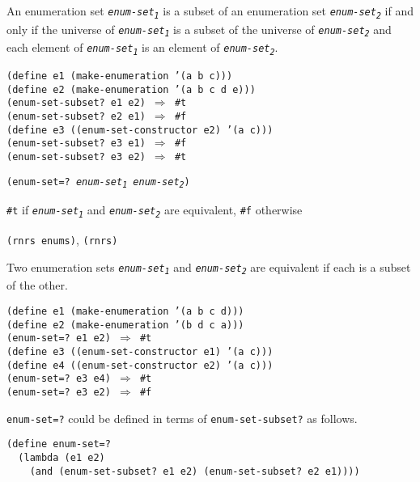 An enumeration set \texttt{\textit{enum-set\textsubscript{1}}} is a subset of an enumeration set \texttt{\textit{enum-set\textsubscript{2}}}
if and only if the universe of \texttt{\textit{enum-set\textsubscript{1}}} is a subset of the universe of \texttt{\textit{enum-set\textsubscript{2}}}
and each element of \texttt{\textit{enum-set\textsubscript{1}}} is an element of \texttt{\textit{enum-set\textsubscript{2}}}.


\begin{alltt}
(define e1 (make-enumeration '(a b c)))
(define e2 (make-enumeration '(a b c d e)))
(enum-set-subset? e1 e2) \(\Rightarrow\) \#{}t
(enum-set-subset? e2 e1) \(\Rightarrow\) \#{}f
(define e3 ((enum-set-constructor e2) '(a c)))
(enum-set-subset? e3 e1) \(\Rightarrow\) \#{}f
(enum-set-subset? e3 e2) \(\Rightarrow\) \#{}t
\end{alltt}

\begin{description}

\label{objects_s296}\item[procedure] \texttt{(enum-set=? \textit{enum-set\textsubscript{1}} \textit{enum-set\textsubscript{2}})}



\item[returns] \texttt{\#{}t} if \texttt{\textit{enum-set\textsubscript{1}}} and \texttt{\textit{enum-set\textsubscript{2}}} are equivalent, \texttt{\#{}f} otherwise


\item[libraries] \texttt{(rnrs enums)}, \texttt{(rnrs)}
\end{description}


Two enumeration sets \texttt{\textit{enum-set\textsubscript{1}}} and \texttt{\textit{enum-set\textsubscript{2}}} are equivalent if each is
a subset of the other.


\begin{alltt}
(define e1 (make-enumeration '(a b c d)))
(define e2 (make-enumeration '(b d c a)))
(enum-set=? e1 e2) \(\Rightarrow\) \#{}t
(define e3 ((enum-set-constructor e1) '(a c)))
(define e4 ((enum-set-constructor e2) '(a c)))
(enum-set=? e3 e4) \(\Rightarrow\) \#{}t
(enum-set=? e3 e2) \(\Rightarrow\) \#{}f
\end{alltt}

\texttt{enum-set=?} could be defined in terms of \texttt{enum-set-subset?} as follows.

\begin{alltt}
(define enum-set=?
  (lambda (e1 e2)
    (and (enum-set-subset? e1 e2) (enum-set-subset? e2 e1))))
\end{alltt}

